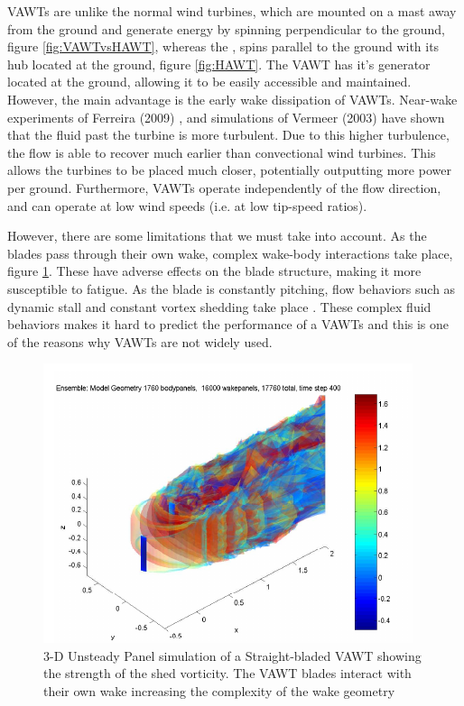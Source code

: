 VAWTs are unlike the normal wind turbines, which are mounted on a mast away from the ground and generate energy by spinning perpendicular to the ground, figure \ref{fig:VAWTvsHAWT}, whereas the , spins parallel to the ground with its hub located at the ground, figure \ref{fig:HAWT}. The VAWT has it's generator located at the ground, allowing it to be easily accessible and maintained. However, the main advantage is the early wake dissipation of VAWTs. Near-wake experiments of Ferreira (2009) \cite{SimaoFerreira2009}, and simulations of Vermeer (2003) \cite{Vermeer2003a} have shown that the fluid past the turbine is more turbulent. Due to this higher turbulence, the flow is able to recover much earlier than convectional wind turbines. This allows the turbines to be placed much closer, potentially outputting more power per ground. Furthermore, VAWTs operate independently of the flow direction, and can operate at low wind speeds (i.e. at low tip-speed ratios).

However, there are some limitations that we must take into account. As the blades pass through their own wake, complex wake-body interactions take place, figure \ref{fig:3DunsteadyPanelVAWT}. These have adverse effects on the blade structure, making it more susceptible to fatigue. As the blade is constantly pitching, flow behaviors such as dynamic stall and constant vortex shedding take place \cite{SimaoFerreira2008a}. These complex fluid behaviors makes it hard to predict the performance of a VAWTs and this is one of the reasons why VAWTs are not widely used. 

	\begin{figure}[!t]
		\centering
		\includegraphics[width=0.6\linewidth]{figures/introduction/3DunsteadyPanelVAWT.png}
		\caption{3-D Unsteady Panel simulation of a Straight-bladed VAWT showing the strength of the shed vorticity. The VAWT blades interact with their own wake increasing the complexity of the wake geometry \cite{Dixon2008}}
		\label{fig:3DunsteadyPanelVAWT}
	\end{figure}

